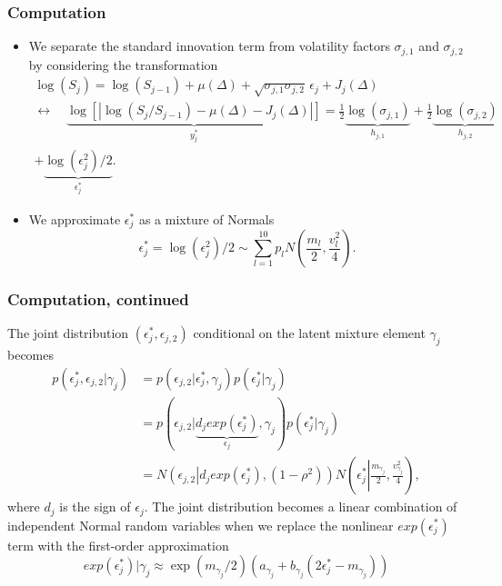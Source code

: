 \documentclass{beamer}
\begin{document}
\begin{frame}
  \frametitle{Computation}
  \begin{itemize}
  \item We separate the standard innovation term from volatility
    factors $\sigma_{j,1}$ and $\sigma_{j,2}$ by considering the
    transformation
  \begin{multline*}
    \log(S_{j}) = \log(S_{j-1}) + \mu(\Delta) + \sqrt{\sigma_{j,1}\sigma_{j,2}} \, \epsilon_{j} + J_j(\Delta) \\
  \leftrightarrow \quad \underbrace{ \log\left[ \left| \log(S_{j}/S_{j-1}) - \mu(\Delta) - J_j(\Delta) \right| \right] }_{y_j^*} = \frac{1}{2}\underbrace{  \log(\sigma_{j,1}) }_{h_{j,1}} + \frac{1}{2}\underbrace{  \log(\sigma_{j,2}) }_{h_{j,2}} \\
   + \underbrace{ \log(  \epsilon_{j}^2  )/2 }_{\epsilon_{j}^{*}}.
 \end{multline*}
 \pause
\item We approximate $\epsilon^*_{j}$ as a mixture of Normals
 \[
   \epsilon^*_{j} = \log( \epsilon_{j}^2 )/2 \sim \sum_{l=1}^{10} p_l N \left( \frac{m_l}{2}, \frac{v_l^2}{4} \right).
 \]
\end{itemize}
\end{frame}
\begin{frame}
  \frametitle{Computation, continued}
  The joint distribution $(\epsilon^*_j, \epsilon_{j,2})$ conditional on the latent mixture element $\gamma_j$ becomes
  \begin{align*}
    p(\epsilon^*_j, \epsilon_{j,2} | \gamma_j) &= p(\epsilon_{j,2}|\epsilon^*_{j}, \gamma_j)p(\epsilon^*_{j}| \gamma_j) \\
                                               &= p(\epsilon_{j,2}|\underbrace{d_j exp(\epsilon^*_{j})}_{\epsilon_j}, \gamma_j)p(\epsilon^*_{j}| \gamma_j) \\
    &= N\left( \epsilon_{j,2} \left| d_j exp(\epsilon^*_{j}), (1-\rho^2) \right.\right) N\left( \epsilon_j^* \left| \frac{m_{\gamma_j}}{2}, \frac{v^2_{\gamma_j}}{4} \right. \right),
  \end{align*}
  where $d_j$ is the sign of $\epsilon_j$. \pause The joint
  distribution becomes a linear combination of independent Normal
  random variables when we replace the nonlinear $exp(\epsilon^*_{j})$
  term with the first-order approximation
  \[
    exp(\epsilon^*_{j}) | \gamma_j \approx \exp(m_{\gamma_j}/2)(a_{\gamma_j} + b_{\gamma_j}(2\epsilon_j^* - m_{\gamma_j}))
  \]
 
\end{frame}
\end{document}
